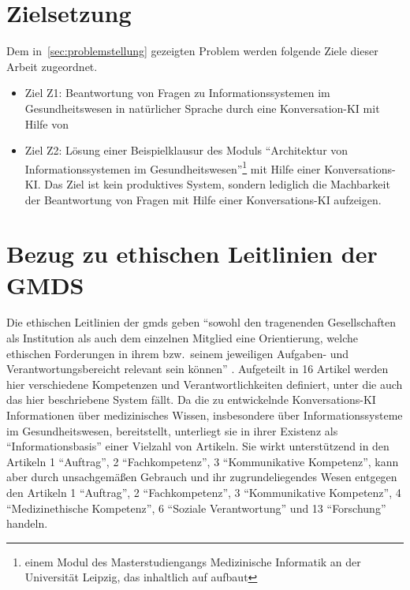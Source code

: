 \section{Zielsetzung}\label{sec:zielsetzung}

Dem in~\ref{sec:problemstellung} gezeigten Problem werden folgende Ziele dieser Arbeit zugeordnet.
\begin{itemize}
  \item Ziel Z1: Beantwortung von Fragen zu Informationssystemen im Gesundheitswesen in natürlicher Sprache durch eine Konversation-KI mit Hilfe von \citet{bb}
  \item Ziel Z2: Lösung einer Beispielklausur des Moduls \enquote{Architektur von Informationssystemen im Gesundheitswesen}\footnote{\raggedright{}einem Modul des Masterstudiengangs Medizinische Informatik an der Universität Leipzig, das inhaltlich auf \citet{bb} aufbaut} mit Hilfe einer Konversations-KI.\@
  Das Ziel ist kein produktives System, sondern lediglich die Machbarkeit der Beantwortung von Fragen mit Hilfe einer Konversations-KI aufzeigen.
\end{itemize}

\section{Bezug zu ethischen Leitlinien der GMDS}\label{sec:gmds_ethik}

Die ethischen Leitlinien der \ac{gmds} \citep{gmds_eth} geben \enquote{sowohl den tragenenden Gesellschaften als Institution als auch dem einzelnen Mitglied eine Orientierung,
welche ethischen Forderungen in ihrem bzw.\ seinem jeweiligen Aufgaben- und Verantwortungsbereicht relevant sein können} \citep{gmds_eth}.
Aufgeteilt in 16 Artikel werden hier verschiedene Kompetenzen und Verantwortlichkeiten definiert, unter die auch das hier beschriebene System fällt.
Da die zu entwickelnde Konversations-KI Informationen über medizinisches Wissen, insbesondere über Informationssysteme im Gesundheitswesen, bereitstellt,
unterliegt sie in ihrer Existenz als \enquote{Informationsbasis} einer Vielzahl von Artikeln.
Sie wirkt unterstützend in den Artikeln 1 \enquote{Auftrag}, 2 \enquote{Fachkompetenz}, 3 \enquote{Kommunikative Kompetenz},
kann aber durch unsachgemäßen Gebrauch und ihr zugrundeliegendes Wesen entgegen den Artikeln 1 \enquote{Auftrag}, 2 \enquote{Fachkompetenz}, 3 \enquote{Kommunikative Kompetenz},
4 \enquote{Medizinethische Kompetenz}, 6 \enquote{Soziale Verantwortung} und 13 \enquote{Forschung} handeln.\\

